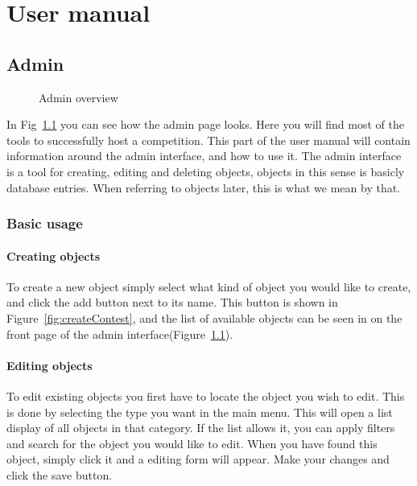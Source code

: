 \chapter{User manual}

\section{Admin}
\begin{figure}
\centering
	\caption{Admin overview}
	\label{fig:adminOverview}
\end{figure}

In Fig~\ref{fig:adminOverview} you can see how the admin page looks. Here you will find
most of the tools to successfully host a competition. This part of the
user manual will contain information around the admin interface, and
how to use it. The admin interface is a tool for creating, editing and
deleting objects, objects in this sense is basicly database entries.
When referring to objects later, this is what we mean by that.


\subsection{Basic usage}

\subsubsection{Creating objects}

To create a new object simply select what kind of object you would like
to create, and click the add button next to its name. This button is
shown in Figure~\ref{fig:createContest}, and the list of available objects can be seen in
on the front page of the admin interface(Figure~\ref{fig:adminOverview}).

\subsubsection{Editing objects}
\label{sec:editObjects}

To edit existing objects you first have to locate the object you wish to
edit. This is done by selecting the type you want in the main menu.
This will open a list display of all objects in that category. If the
list allows it, you can apply filters and search for the object you
would like to edit. When you have found this object, simply click it
and a editing form will appear. Make your changes and click the save
button.

